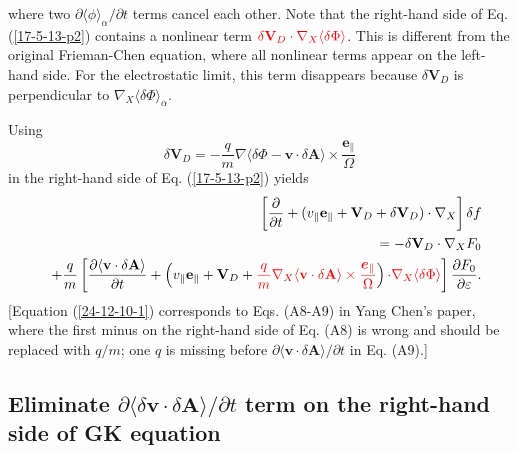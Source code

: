\documentclass{llncs}
\newcommand{\tmcolor}[2]{{\color{#1}{#2}}}
\newcommand{\tmmathbf}[1]{\ensuremath{\boldsymbol{#1}}}
\begin{document}
where two $\partial \langle \phi \rangle_{\alpha} / \partial t$ terms cancel
each other. Note that the right-hand side of Eq. (\ref{17-5-13-p2}) contains a
nonlinear term $\tmcolor{red}{\delta \mathbf{V}_D \cdot \nabla_X \langle
\delta \Phi \rangle}$. This is different from the original Frieman-Chen
equation, where all nonlinear terms appear on the left-hand side. For the
electrostatic limit, this term disappears because $\delta \mathbf{V}_D$ is
perpendicular to $\nabla_X \langle \delta \Phi \rangle_{\alpha}$.

Using
\[ \delta \mathbf{V}_D = - \frac{q}{m} \nabla \langle \delta \Phi -\mathbf{v}
   \cdot \delta \mathbf{A} \rangle \times
   \frac{\mathbf{e}_{\parallel}}{\Omega} \]
in the right-hand side of Eq. (\ref{17-5-13-p2}) yields
\begin{eqnarray}
  &  & \left[ \frac{\partial}{\partial t} + (v_{\parallel}
  \mathbf{e}_{\parallel} +\mathbf{V}_D + \delta \mathbf{V}_D) \cdot \nabla_X
  \right] \delta f \nonumber\\
  &  & = - \delta \mathbf{V}_D \cdot \nabla_X F_0 \nonumber\\
  &  & + \frac{q}{m} \left[ \frac{\partial \langle \mathbf{v} \cdot \delta
  \mathbf{A} \rangle}{\partial t} + \left( v_{\parallel}
  \mathbf{e}_{\parallel} +\mathbf{V}_D + \tmcolor{red}{\frac{q}{m} \nabla_X
  \langle \mathbf{v} \cdot \delta \mathbf{A} \rangle \times
  \frac{\tmmathbf{e}_{\parallel}}{\Omega}} \tmcolor{red}{} \right)
  \tmcolor{red}{\cdot \nabla_X \langle \delta \Phi \rangle} \right]
  \frac{\partial F_0}{\partial \varepsilon} .  \label{24-12-10-1}
\end{eqnarray}
[Equation (\ref{24-12-10-1}) corresponds to Eqs. (A8-A9) in Yang Chen's
paper{\cite{ychen2009}}, where the first minus on the right-hand side of Eq.
(A8) is wrong and should be replaced with $q / m$; one $q$ is missing before
$\partial \langle \mathbf{v} \cdot \delta \mathbf{A} \rangle / \partial t$ in
Eq. (A9).]

\subsection{Eliminate $\partial \langle \delta \mathbf{v} \cdot \delta
\mathbf{A} \rangle / \partial t$ term on the right-hand side of GK
equation}\label{24-3-21-p1}
\end{document}
